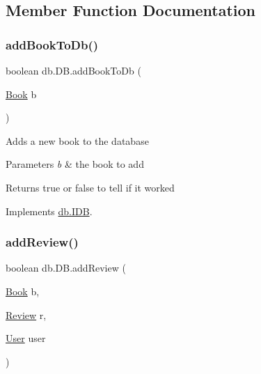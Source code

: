 \subsection{Member Function Documentation}
\mbox{\label{classdb_1_1_d_b_a705ed9c0ffae567ec3ac09fbd7138c6f}} 
\subsubsection{\texorpdfstring{add\+Book\+To\+Db()}{addBookToDb()}}
{\footnotesize\ttfamily boolean db.\+D\+B.\+add\+Book\+To\+Db (\begin{DoxyParamCaption}\item[{\hyperlink{classserver_1_1data_1_1_book}{Book}}]{b }\end{DoxyParamCaption})}

Adds a new book to the database 
\begin{DoxyParams}{Parameters}
{\em b} & the book to add \\
\hline
\end{DoxyParams}
\begin{DoxyReturn}{Returns}
true or false to tell if it worked 
\end{DoxyReturn}


Implements \hyperlink{interfacedb_1_1_i_d_b_a63904b26597f651ea6acbd03384e0afb}{db.\+I\+DB}.

\mbox{\label{classdb_1_1_d_b_accfa7c2f48252f167576221dc14ff721}} 
\subsubsection{\texorpdfstring{add\+Review()}{addReview()}}
{\footnotesize\ttfamily boolean db.\+D\+B.\+add\+Review (\begin{DoxyParamCaption}\item[{\hyperlink{classserver_1_1data_1_1_book}{Book}}]{b,  }\item[{\hyperlink{classserver_1_1data_1_1_review}{Review}}]{r,  }\item[{\hyperlink{classserver_1_1data_1_1_user}{User}}]{user }\end{DoxyParamCaption})}

